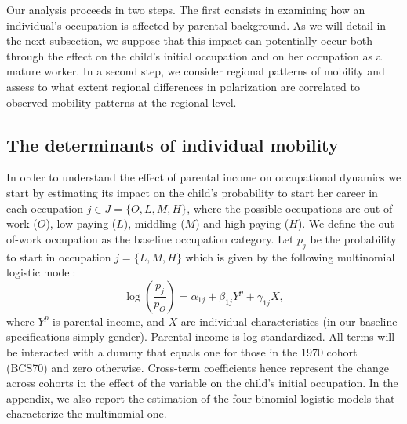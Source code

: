 Our analysis proceeds in two steps. The first consists in examining how an individual's occupation is affected by parental background. As we will detail in the next subsection, we suppose that this impact can potentially occur both through the effect on the child's initial occupation and on her occupation as a mature worker. In a second step, we consider regional patterns of mobility and assess to what extent regional differences in polarization are correlated to observed mobility patterns at the regional level.

\subsection{The determinants of individual mobility} \label{chap2-specification1}

In order to understand the effect of parental income on occupational dynamics we start by estimating its impact on the child's probability to start her career in each occupation $j\in J = \{O, L , M, H\}$, where the possible occupations are out-of-work ($O$), low-paying ($L$), middling ($M$) and high-paying ($H$). We define the out-of-work occupation as the baseline occupation category. Let $p_j$ be the probability to start in occupation $j = \{L , M, H\}$ which is given by the following multinomial logistic model:
\begin{equation}\label{chap2-eq:emp-multi1}
    \log\left(\frac{p_j}{p_O}\right) = \alpha_{1j} + \beta_{1j} Y^p + \gamma_{1j} X,
\end{equation}
where $Y^p$ is parental income, and $X$ are individual characteristics (in our baseline specifications simply gender). Parental income is log-standardized. All terms will be interacted with a dummy that equals one for those in the 1970 cohort (BCS70) and zero otherwise. Cross-term coefficients hence represent the change across cohorts in the effect of the variable on the child's initial occupation. In the appendix, we also report the estimation of the four binomial logistic models that characterize the multinomial one.

